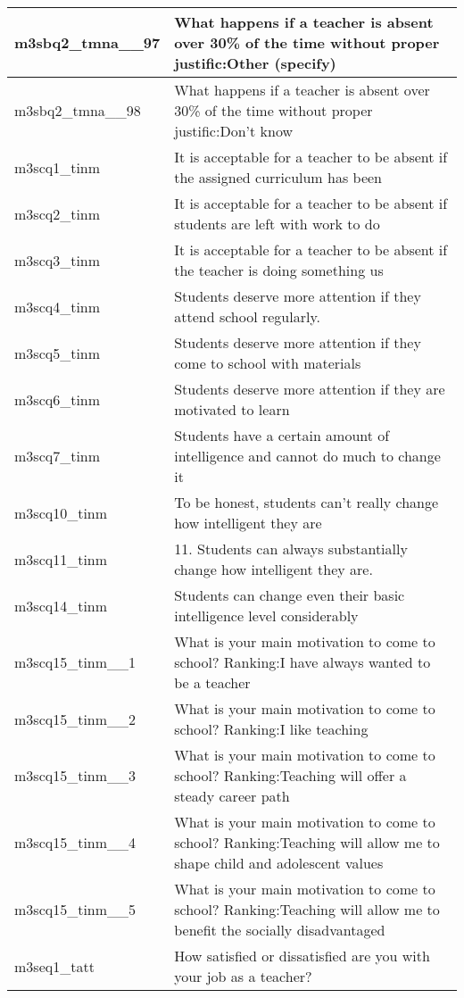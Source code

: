 \documentclass[
]{article}
\begin{document}
\begin{table}
\begin{tabular}[t]{l|l}
\hline
m3sbq2\_tmna\_\_97 & What happens if a teacher is absent over 30\% of the time without proper justific:Other (specify)\\
\hline
m3sbq2\_tmna\_\_98 & What happens if a teacher is absent over 30\% of the time without proper justific:Don’t know\\
\hline
m3scq1\_tinm & It is acceptable for a teacher to be absent if the assigned curriculum has been\\
\hline
m3scq2\_tinm & It is acceptable for a teacher to be absent if students are left with work to do\\
\hline
m3scq3\_tinm & It is acceptable for a teacher to be absent if the teacher is doing something us\\
\hline
m3scq4\_tinm & Students deserve more attention if they attend school regularly.\\
\hline
m3scq5\_tinm & Students deserve more attention if they come to school with materials\\
\hline
m3scq6\_tinm & Students deserve more attention if they are motivated to learn\\
\hline
m3scq7\_tinm & Students have a certain amount of intelligence and cannot do much to change it\\
\hline
m3scq10\_tinm & To be honest, students can’t really change how intelligent they are\\
\hline
m3scq11\_tinm & 11. Students can always substantially change how intelligent they are.\\
\hline
m3scq14\_tinm & Students can change even their basic intelligence level considerably\\
\hline
m3scq15\_tinm\_\_1 & What is your main motivation to come to school? Ranking:I have always wanted to be a teacher\\
\hline
m3scq15\_tinm\_\_2 & What is your main motivation to come to school? Ranking:I like teaching\\
\hline
m3scq15\_tinm\_\_3 & What is your main motivation to come to school? Ranking:Teaching will offer a steady career path\\
\hline
m3scq15\_tinm\_\_4 & What is your main motivation to come to school? Ranking:Teaching will allow me to shape child and adolescent values\\
\hline
m3scq15\_tinm\_\_5 & What is your main motivation to come to school? Ranking:Teaching will allow me to benefit the socially disadvantaged\\
\hline
m3seq1\_tatt & How satisfied or dissatisfied are you with your job as a teacher?\\

\end{tabular}
\end{table}
\end{document}
